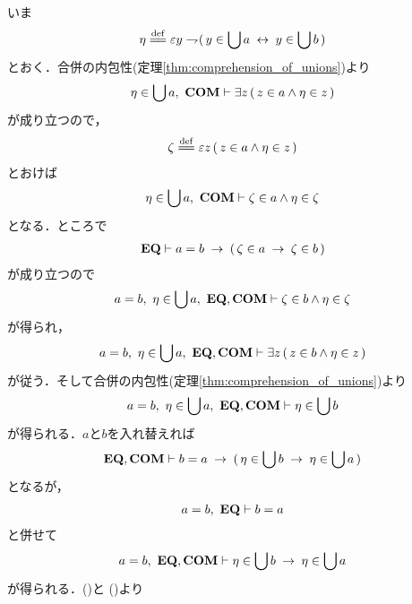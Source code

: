 	\begin{sketch}
		いま
		\begin{align}
			\eta \defeq \varepsilon y \negation (\, y \in \bigcup a 
			\lrarrow y \in \bigcup b\, )
		\end{align}
		とおく．合併の内包性(定理\ref{thm:comprehension_of_unions})より
		\begin{align}
			\eta \in \bigcup a,\ \mbox{\bf COM} \vdash
			\exists z\, (\, z \in a \wedge \eta \in z\, )
		\end{align}
		が成り立つので，
		\begin{align}
			\zeta \defeq \varepsilon z\, (\, z \in a \wedge \eta \in z\, )
		\end{align}
		とおけば
		\begin{align}
			\eta \in \bigcup a,\ \mbox{\bf COM} \vdash
			\zeta \in a \wedge \eta \in \zeta
		\end{align}
		となる．ところで
		\begin{align}
			\mbox{{\bf EQ}} \vdash a = b \hspace{0.25em}\rightarrow\hspace{0.25em} (\, \zeta \in a \hspace{0.25em}\rightarrow\hspace{0.25em} \zeta \in b\, )
		\end{align}
		が成り立つので
		\begin{align}
			a = b,\ \eta \in \bigcup a,\ \mbox{{\bf EQ}},\mbox{\bf COM} \vdash
			\zeta \in b \wedge \eta \in \zeta
		\end{align}
		が得られ，
		\begin{align}
			a = b,\ \eta \in \bigcup a,\ \mbox{{\bf EQ}},\mbox{\bf COM} \vdash
			\exists z\, (\, z \in b \wedge \eta \in z\, )
		\end{align}
		が従う．そして合併の内包性(定理\ref{thm:comprehension_of_unions})より
		\begin{align}
			a = b,\ \eta \in \bigcup a,\ \mbox{{\bf EQ}},\mbox{\bf COM} \vdash \eta \in \bigcup b
			\label{fom:unions_of_equal_classes_are_equal_1}
		\end{align}
		が得られる．$a$と$b$を入れ替えれば
		\begin{align}
			\mbox{{\bf EQ}},\mbox{\bf COM} \vdash 
			b = a \hspace{0.25em}\rightarrow\hspace{0.25em} (\, \eta \in \bigcup b \hspace{0.25em}\rightarrow\hspace{0.25em} \eta \in \bigcup a\, )
		\end{align}
		となるが，
		\begin{align}
			a = b,\ \mbox{{\bf EQ}} \vdash b = a 
		\end{align}
		と併せて
		\begin{align}
			a = b,\ \mbox{{\bf EQ}},\mbox{\bf COM} \vdash 
			\eta \in \bigcup b \hspace{0.25em}\rightarrow\hspace{0.25em} \eta \in \bigcup a
			\label{fom:unions_of_equal_classes_are_equal_2}
		\end{align}
		が得られる．()と
		()より

\end{sketch}
